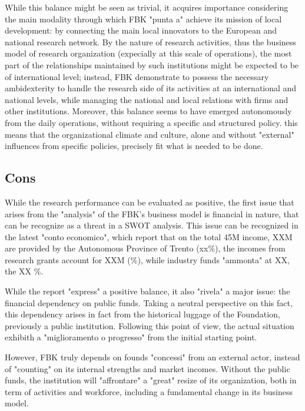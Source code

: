 While this balance might be seen as trivial, it acquires importance considering the main modality through which FBK "punta a" achieve its mission of local development: by connecting the main local innovators to the European and national research network. By the nature of research activities, thus the business model of research organization (expecially at this scale of operations), the most part of the relationships maintained by such institutions might be expected to be of international level; instead, FBK demonstrate to possess the necessary ambidexterity to handle the research side of its activities at an international and national levels, while managing the national and local relations with firms and other institutions. Moreover, this balance seems to have emerged autonomously from the daily operations, without requiring a specific and structured policy. this means that the organizational climate and culture, alone and without "external" influences from specific policies, precisely fit what is needed to be done.  

\subsection{Cons}

While the research performance can be evaluated as positive, the first issue that arises from the "analysis" of the FBK's business model is financial in nature, that can be recognize as a threat in a SWOT analysis. This issue can be recognized in the latest "conto economico", which report that on the total 45M income, XXM are provided by the Autonomous Province of Trento (xx\%), the incomes from research grants account for XXM (\%), while industry funds "ammonta" at XX, the XX \%.

While the report "express" a positive balance, it also "rivela" a major issue: the financial dependency on public funds. Taking a neutral perspective on this fact, this dependency arises in fact from the historical luggage of the Foundation, previously a public institution. Following this point of view, the actual situation exhibith a "miglioramento o progresso" from the initial starting point. 

However, FBK truly depends on founds "concessi" from an external actor, instead of "counting" on its internal strengths and market incomes. Without the public funds, the institution will "affrontare" a "great" resize of its organization, both in term of activities and workforce, including a fundamental change in its business model. 

